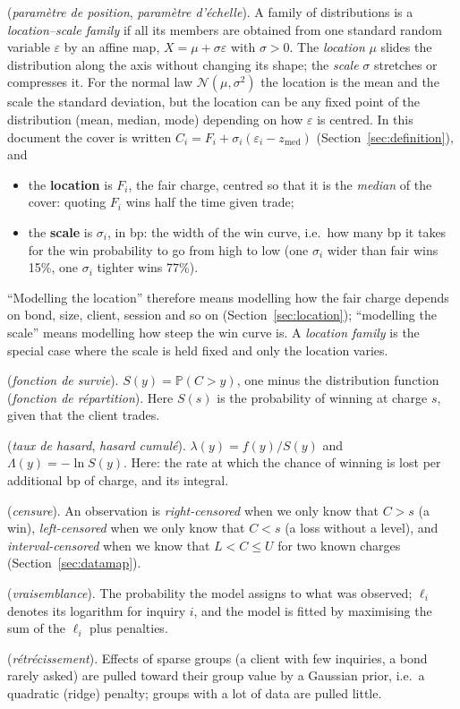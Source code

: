 \documentclass[11pt,a4paper]{article}
\theoremstyle{definition}
\theoremstyle{remark}
\newcommand{\Prob}{\mathbb{P}}
\newcommand{\zm}{z_{\mathrm{med}}}
\begin{document}
\begin{description}[itemsep=3pt,leftmargin=0pt]
\item[Location and scale] (\emph{paramètre de position}, \emph{paramètre d'échelle}). A family of distributions is a \emph{location--scale family} if all its members are obtained from one standard random variable $\varepsilon$ by an affine map, $X=\mu+\sigma\varepsilon$ with $\sigma>0$. The \emph{location} $\mu$ slides the distribution along the axis without changing its shape; the \emph{scale} $\sigma$ stretches or compresses it. For the normal law $\mathcal N(\mu,\sigma^2)$ the location is the mean and the scale the standard deviation, but the location can be any fixed point of the distribution (mean, median, mode) depending on how $\varepsilon$ is centred. In this document the cover is written $C_i=F_i+\sigma_i(\varepsilon_i-\zm)$ (Section~\ref{sec:definition}), and
\begin{itemize}[itemsep=1pt]
\item the \textbf{location} is $F_i$, the fair charge, centred so that it is the \emph{median} of the cover: quoting $F_i$ wins half the time given trade;
\item the \textbf{scale} is $\sigma_i$, in bp: the width of the win curve, i.e.\ how many bp it takes for the win probability to go from high to low (one $\sigma_i$ wider than fair wins 15\%, one $\sigma_i$ tighter wins 77\%).
\end{itemize}
``Modelling the location'' therefore means modelling how the fair charge depends on bond, size, client, session and so on (Section~\ref{sec:location}); ``modelling the scale'' means modelling how steep the win curve is. A \emph{location family} is the special case where the scale is held fixed and only the location varies.
\item[Survival function] (\emph{fonction de survie}). $S(y)=\Prob(C>y)$, one minus the distribution function (\emph{fonction de répartition}). Here $S(s)$ is the probability of winning at charge $s$, given that the client trades.
\item[Hazard and cumulative hazard] (\emph{taux de hasard}, \emph{hasard cumulé}). $\lambda(y)=f(y)/S(y)$ and $\Lambda(y)=-\ln S(y)$. Here: the rate at which the chance of winning is lost per additional bp of charge, and its integral.
\item[Censoring] (\emph{censure}). An observation is \emph{right-censored} when we only know that $C>s$ (a win), \emph{left-censored} when we only know that $C<s$ (a loss without a level), and \emph{interval-censored} when we know that $L<C\le U$ for two known charges (Section~\ref{sec:datamap}).
\item[Likelihood] (\emph{vraisemblance}). The probability the model assigns to what was observed; $\ell_i$ denotes its logarithm for inquiry $i$, and the model is fitted by maximising the sum of the $\ell_i$ plus penalties.
\item[Partial pooling, shrinkage] (\emph{rétrécissement}). Effects of sparse groups (a client with few inquiries, a bond rarely asked) are pulled toward their group value by a Gaussian prior, i.e.\ a quadratic (ridge) penalty; groups with a lot of data are pulled little.
\end{description}
\end{document}
